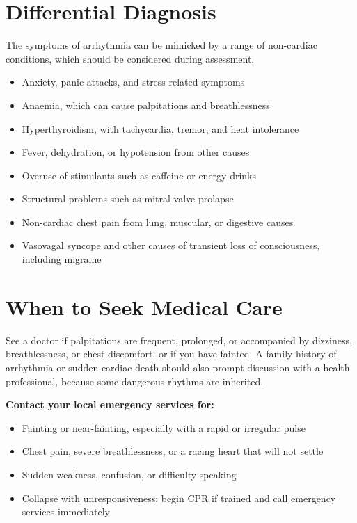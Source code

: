 \section*{Differential Diagnosis}
The symptoms of arrhythmia can be mimicked by a range of non-cardiac conditions, which should be considered during assessment.

\begin{itemize}
    \item Anxiety, panic attacks, and stress-related symptoms
    \item Anaemia, which can cause palpitations and breathlessness
    \item Hyperthyroidism, with tachycardia, tremor, and heat intolerance
    \item Fever, dehydration, or hypotension from other causes
    \item Overuse of stimulants such as caffeine or energy drinks
    \item Structural problems such as mitral valve prolapse
    \item Non-cardiac chest pain from lung, muscular, or digestive causes
    \item Vasovagal syncope and other causes of transient loss of consciousness, including migraine
\end{itemize}

\section*{When to Seek Medical Care}
See a doctor if palpitations are frequent, prolonged, or accompanied by dizziness, breathlessness, or chest discomfort, or if you have fainted. A family history of arrhythmia or sudden cardiac death should also prompt discussion with a health professional, because some dangerous rhythms are inherited.

\textbf{Contact your local emergency services for:}
\begin{itemize}
    \item Fainting or near-fainting, especially with a rapid or irregular pulse
    \item Chest pain, severe breathlessness, or a racing heart that will not settle
    \item Sudden weakness, confusion, or difficulty speaking
    \item Collapse with unresponsiveness: begin CPR if trained and call emergency services immediately
\end{itemize}


